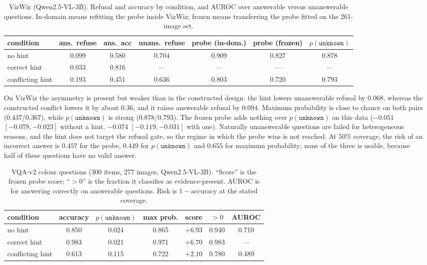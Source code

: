 \documentclass[10pt]{article}
\newcommand{\unknown}{\texttt{unknown}}
\newcommand{\punk}{p(\unknown)}
\begin{document}
\begin{table}[h]
\centering
\small
\caption{VizWiz (Qwen2.5-VL-3B). Refusal and accuracy by condition, and AUROC over answerable versus unanswerable questions. In-domain means refitting the probe inside VizWiz; frozen means transferring the probe fitted on the 261-image set.}
\label{tab:vizwiz}
\begin{tabular}{lcccccc}
\toprule
condition & ans.\ refuse & ans.\ acc & unans.\ refuse & probe (in-dom.) & probe (frozen) & $\punk$ \\
\midrule
no hint & 0.099 & 0.580 & 0.704 & 0.909 & 0.827 & 0.878 \\
correct hint & 0.033 & 0.816 & --- & --- & --- & --- \\
conflicting hint & 0.193 & 0.451 & 0.636 & 0.803 & 0.720 & 0.793 \\
\bottomrule
\end{tabular}
\end{table}

On VizWiz the asymmetry is present but weaker than in the constructed design: the hint lowers unanswerable refusal by $0.068$, whereas the constructed conflict lowers it by about $0.36$, and it raises answerable refusal by $0.094$. Maximum probability is close to chance on both pairs ($0.437$/$0.367$), while $\punk$ is strong ($0.878$/$0.793$). The frozen probe adds nothing over $\punk$ on this data ($-0.051$ $[-0.078,-0.023]$ without a hint, $-0.074$ $[-0.119,-0.031]$ with one). Naturally unanswerable questions are failed for heterogeneous reasons, and the hint does not target the refusal gate, so the regime in which the probe wins is not reached. At $50\%$ coverage, the risk of an incorrect answer is $0.457$ for the probe, $0.449$ for $\punk$ and $0.655$ for maximum probability; none of the three is usable, because half of these questions have no valid answer.

\begin{table}[h]
\centering
\small
\caption{VQA-v2 colour questions (300 items, 277 images, Qwen2.5-VL-3B). ``Score'' is the frozen probe score; ``$>0$'' is the fraction it classifies as evidence-present. AUROC is for answering correctly on answerable questions. Risk is $1-\text{accuracy}$ at the stated coverage.}
\label{tab:vqa}
\begin{tabular}{lcccccc}
\toprule
condition & accuracy & $\punk$ & max prob. & score & $>0$ & AUROC \\
\midrule
no hint & 0.850 & 0.024 & 0.865 & $+6.93$ & 0.940 & 0.710 \\
correct hint & 0.983 & 0.021 & 0.971 & $+6.70$ & 0.983 & --- \\
conflicting hint & 0.613 & 0.115 & 0.722 & $+2.10$ & 0.780 & 0.489 \\
\bottomrule
\end{tabular}
\end{table}
\end{document}
